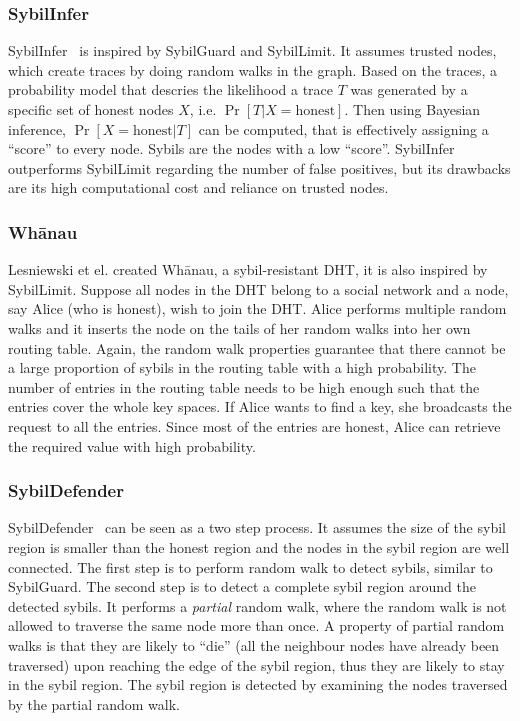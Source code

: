 \subsubsection{SybilInfer}
SybilInfer~\cite{danezis2009sybilinfer} is inspired by SybilGuard and
SybilLimit. It assumes trusted nodes, which create traces by doing random walks
in the graph. Based on the traces, a probability model that descries the
likelihood a trace $T$ was generated by a specific set of honest nodes $X$, i.e.
$\Pr[ T | X = \text{honest}]$. Then using Bayesian inference, $\Pr[ X =
\text{honest}| T ]$ can be computed, that is effectively assigning a ``score''
to every node. Sybils are the nodes with a low ``score''. SybilInfer outperforms
SybilLimit regarding the number of false positives, but its drawbacks are its
high computational cost and reliance on trusted nodes.

\subsubsection{Wh\={a}nau}
Lesniewski et el. created Wh\={a}nau, a sybil-resistant DHT, it is also inspired
by SybilLimit\cite{lesniewski2008sybil, lesniewski2010whanau}. Suppose all nodes
in the DHT belong to a social network and a node, say Alice (who is honest),
wish to join the DHT. Alice performs multiple random walks and it inserts the
node on the tails of her random walks into her own routing table. Again, the
random walk properties guarantee that there cannot be a large proportion of
sybils in the routing table with a high probability. The number of entries in
the routing table needs to be high enough such that the entries cover the whole
key spaces. If Alice wants to find a key, she broadcasts the request to all the
entries. Since most of the entries are honest, Alice can retrieve the required
value with high probability.

\subsubsection{SybilDefender}
SybilDefender~\cite{wei2012sybildefender} can be seen as a two step process. It
assumes the size of the sybil region is smaller than the honest region and the
nodes in the sybil region are well connected. The first step is to perform
random walk to detect sybils, similar to SybilGuard. The second step is to
detect a complete sybil region around the detected sybils. It performs a
\emph{partial} random walk, where the random walk is not allowed to traverse the
same node more than once. A property of partial random walks is that they are
likely to ``die'' (all the neighbour nodes have already been traversed) upon
reaching the edge of the sybil region, thus they are likely to stay in the sybil
region. The sybil region is detected by examining the nodes traversed by the
partial random walk.


